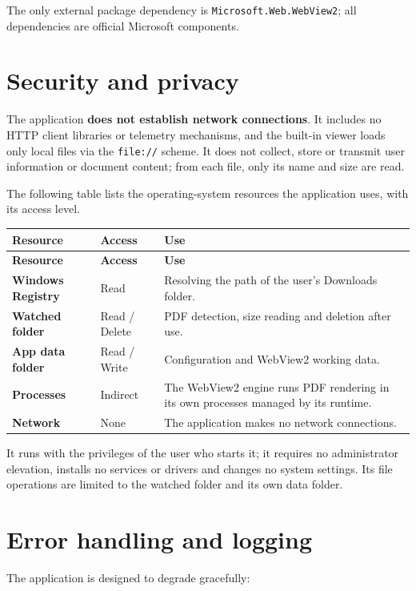 \documentclass[11pt,a4paper]{article}
\begin{document}
The only external package dependency is \texttt{Microsoft.Web.WebView2}; all
dependencies are official Microsoft components.

\section{Security and privacy}
The application \textbf{does not establish network connections}. It includes no
HTTP client libraries or telemetry mechanisms, and the built-in viewer loads only
local files via the \texttt{file://} scheme. It does not collect, store or
transmit user information or document content; from each file, only its name and
size are read.

The following table lists the operating-system resources the application uses,
with its access level.

\begin{xltabular}{\textwidth}{@{} >{\bfseries}p{4.3cm} p{2.8cm} L @{}}
\toprule
\normalfont\textbf{Resource} & \textbf{Access} & \textbf{Use} \\
\midrule
\endfirsthead
\toprule
\normalfont\textbf{Resource} & \textbf{Access} & \textbf{Use} \\
\midrule
\endhead
\bottomrule
\endfoot
Windows Registry & Read & Resolving the path of the user's Downloads folder. \\
Watched folder & Read / Delete & PDF detection, size reading and deletion after use. \\
App data folder & Read / Write & Configuration and WebView2 working data. \\
Processes & Indirect & The WebView2 engine runs PDF rendering in its own processes managed by its runtime. \\
Network & None & The application makes no network connections. \\
\bottomrule
\end{xltabular}

It runs with the privileges of the user who starts it; it requires no
administrator elevation, installs no services or drivers and changes no system
settings. Its file operations are limited to the watched folder and its own data
folder.

\section{Error handling and logging}
The application is designed to degrade gracefully:
\end{document}
